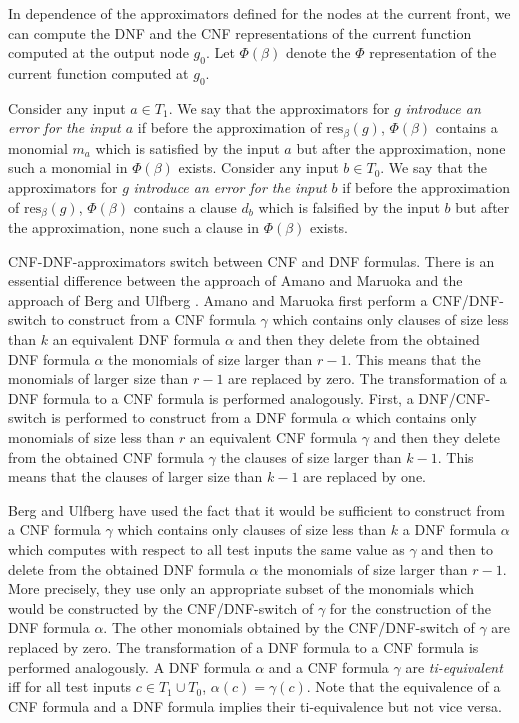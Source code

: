 \documentclass[11pt]{article}
\begin{document}
In dependence of the approximators defined for the nodes at the current front, we can compute the DNF and the CNF
representations of the current function computed at the output node $g_0$. Let $\Phi(\beta)$ denote the $\Phi$
representation of the current function computed at $g_0$.

Consider any input $a \in T_1$. We say that the approximators for $g$ {\em introduce an error for the input $a$} if
before the approximation of $\mbox{res}_{\beta}(g)$, $\Phi(\beta)$ contains a monomial $m_a$ which is satisfied by
the input $a$ but after the approximation, none such a monomial in $\Phi(\beta)$ exists.
Consider any input $b \in T_0$. We say that the approximators for $g$ {\em introduce an error for the input $b$} if
before the approximation of $\mbox{res}_{\beta}(g)$, $\Phi(\beta)$ contains a clause $d_b$ which is falsified by the
input $b$ but after the approximation, none such a clause in $\Phi(\beta)$ exists.

CNF-DNF-approximators switch between CNF and DNF formulas. There is an essential difference between the approach
of Amano and Maruoka \cite{AmMa} and the approach of Berg and Ulfberg \cite{BeUl}. Amano and Maruoka first perform
a CNF/DNF-switch to construct from a CNF formula $\gamma$ which contains only clauses of size less
than $k$ an equivalent DNF formula $\alpha$ and then they delete from the obtained DNF formula $\alpha$ the
monomials of size larger than $r-1$. This means that the monomials of larger size than $r-1$ are replaced by zero.
The transformation of a DNF formula to a CNF formula is performed analogously.
First, a DNF/CNF-switch is performed to construct from a DNF formula $\alpha$ which contains only monomials of size
less than $r$ an equivalent CNF formula $\gamma$ and then they delete from the obtained CNF formula $\gamma$ the
clauses of size larger than $k-1$. This means that the clauses of larger size than $k-1$ are replaced by one.

Berg and Ulfberg have used the fact that it would be sufficient to construct from a CNF formula $\gamma$ which
contains only clauses of size less than $k$ a DNF formula $\alpha$ which computes with respect to all test inputs
the same value as $\gamma$ and then to delete from the obtained DNF formula $\alpha$ the monomials of size larger
than $r-1$. More precisely, they use only an appropriate subset of the monomials which would be constructed by the
CNF/DNF-switch of $\gamma$ for the construction of the DNF formula $\alpha$. The other monomials obtained by the
CNF/DNF-switch of $\gamma$ are replaced by zero. The
transformation of a DNF formula to a CNF formula is performed analogously. A DNF formula $\alpha$ and a CNF formula
$\gamma$  are {\em ti-equivalent\/} iff for all test inputs $c \in T_1 \cup T_0$, $\alpha(c) = \gamma(c)$.
Note that the equivalence of a CNF formula and a DNF formula implies their ti-equivalence but not vice versa.
\end{document}
